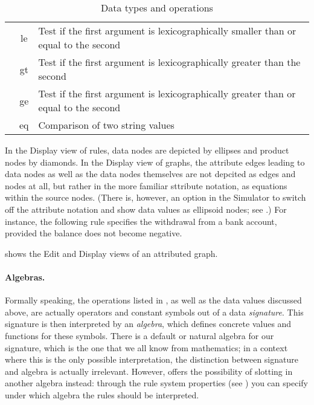 \begin{table}
\begin{center}
\begin{tabular}{|c|c|l|}
  & \sf le & Test if the first argument is
  lexicographically smaller than or equal to the second \\
  & \sf gt & Test if the first argument is
  lexicographically greater than the second \\
  & \sf ge &Test if the first argument is
  lexicographically greater than or equal to the second \\
  & \sf eq & Comparison of two string values \\
\hline\hline
\end{tabular}
\end{center}
\vspace*{-\medskipamount}
\caption{Data types and operations}
\vspace*{-\medskipamount}
\end{table}

In the Display view of rules, data nodes are depicted by ellipses and product
nodes by diamonds. In the Display view of graphs, the attribute edges leading
to data nodes as well as the data nodes themselves are not depcited as edges
and nodes at all, but rather in the more familiar sttribute notation, as
equations within the source nodes. (There is, however, an option in the
Simulator to switch off the attribute notation and show data values as
ellipsoid nodes; see .) For instance, the following rule
specifies the withdrawal from a bank account, provided the balance does not
become negative.


 shows the Edit and Display views of an attributed graph.


\paragraph{Algebras.}

Formally speaking, the operations listed in , as well as the data
values discussed above, are actually operators and constant symbols out of a
data \emph{signature}. This signature is then interpreted by an \emph{algebra},
which defines concrete values and functions for these symbols. There is a
default or natural algebra for our signature, which is the one that we all know
from mathematics; in a context where this is the only possible interpretation,
the distinction between signature and algebra is actually irrelevant. However,
\Groove{} offers the possibility of slotting in another algebra instead:
through the rule system properties (see ) you can
specify under which algebra the rules should be interpreted.

